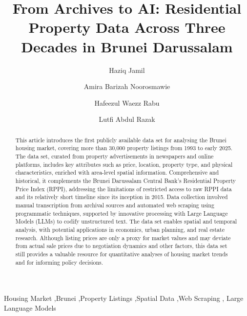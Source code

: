 \documentclass[
  number]{elsarticle}
\begin{document}
\begin{frontmatter}
\title{From Archives to AI: Residential Property Data Across Three
Decades in Brunei Darussalam}
\author[1]{Haziq Jamil%
%
}
\author[1]{Amira Barizah Noorosmawie%
%
}

\author[1]{Hafeezul Waezz Rabu%
%
}

\author[2]{Lutfi Abdul Razak%
%
}






        
\begin{abstract}
This article introduces the first publicly available data set for
analysing the Brunei housing market, covering more than 30,000 property
listings from 1993 to early 2025. The data set, curated from property
advertisements in newspapers and online platforms, includes key
attributes such as price, location, property type, and physical
characteristics, enriched with area-level spatial information.
Comprehensive and historical, it complements the Brunei Darussalam
Central Bank's Residential Property Price Index (RPPI), addressing the
limitations of restricted access to raw RPPI data and its relatively
short timeline since its inception in 2015. Data collection involved
manual transcription from archival sources and automated web scraping
using programmatic techniques, supported by innovative processing with
Large Language Models (LLMs) to codify unstructured text. The data set
enables spatial and temporal analysis, with potential applications in
economics, urban planning, and real estate research. Although listing
prices are only a proxy for market values and may deviate from actual
sale prices due to negotiation dynamics and other factors, this data set
still provides a valuable resource for quantitative analyses of housing
market trends and for informing policy decisions.
\end{abstract}





\begin{keyword}
    Housing Market \sep Brunei \sep Property Listings \sep Spatial
Data \sep Web Scraping \sep 
    Large Language Models
\end{keyword}
\end{frontmatter}
    
\end{document}
